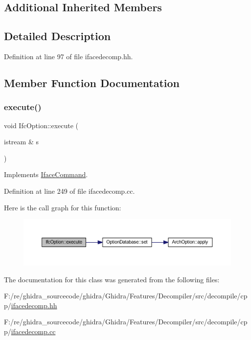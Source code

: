 \subsection*{Additional Inherited Members}


\subsection{Detailed Description}


Definition at line 97 of file ifacedecomp.\+hh.



\subsection{Member Function Documentation}
\mbox{\label{class_ifc_option_a2337595063d7701739837999034ac8bf}} 
\subsubsection{\texorpdfstring{execute()}{execute()}}
{\footnotesize\ttfamily void Ifc\+Option\+::execute (\begin{DoxyParamCaption}\item[{istream \&}]{s }\end{DoxyParamCaption})\hspace{0.3cm}{\ttfamily [virtual]}}



Implements \mbox{\hyperlink{class_iface_command_af10e29cee2c8e419de6efe9e680ad201}{Iface\+Command}}.



Definition at line 249 of file ifacedecomp.\+cc.

Here is the call graph for this function\+:
\nopagebreak
\begin{figure}[H]
\begin{center}
\leavevmode
\includegraphics[width=350pt]{class_ifc_option_a2337595063d7701739837999034ac8bf_cgraph}
\end{center}
\end{figure}


The documentation for this class was generated from the following files\+:\begin{DoxyCompactItemize}
\item 
F\+:/re/ghidra\+\_\+sourcecode/ghidra/\+Ghidra/\+Features/\+Decompiler/src/decompile/cpp/\mbox{\hyperlink{ifacedecomp_8hh}{ifacedecomp.\+hh}}\item 
F\+:/re/ghidra\+\_\+sourcecode/ghidra/\+Ghidra/\+Features/\+Decompiler/src/decompile/cpp/\mbox{\hyperlink{ifacedecomp_8cc}{ifacedecomp.\+cc}}\end{DoxyCompactItemize}

